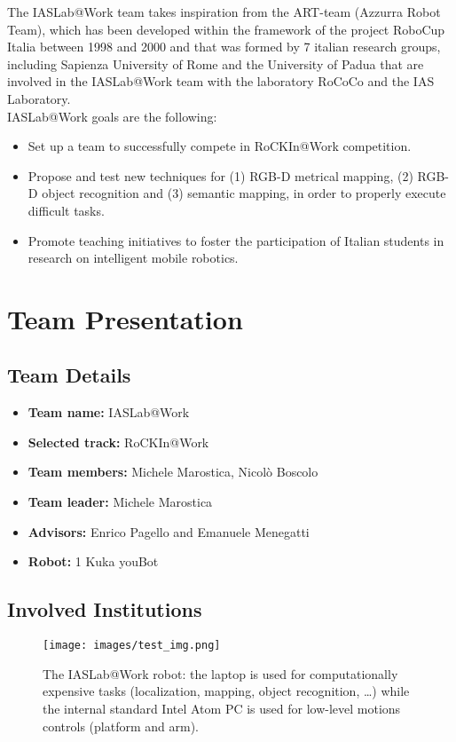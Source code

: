 \documentclass[conference]{IEEEtran}
\begin{document}
The IASLab@Work team takes inspiration from the ART-team (Azzurra Robot Team), which has been developed within the framework of the project RoboCup Italia between 1998 and 2000 and that was formed by 7 italian research groups, including Sapienza University of Rome and the University of Padua that are involved in the IASLab@Work team with the laboratory RoCoCo and the IAS Laboratory.\\ 

IASLab@Work goals are the following:
\begin{itemize}
 \item Set up a team to successfully compete in RoCKIn@Work competition.
 \item Propose and test new techniques for (1) RGB-D metrical mapping, (2) RGB-D object recognition and (3) semantic mapping, in order to properly execute difficult tasks.
 \item Promote teaching initiatives to foster the participation of Italian students in research on intelligent mobile robotics.
\end{itemize}
 
\section{Team Presentation}
\subsection{Team Details}

\begin{itemize}
 \item \textbf{Team name:} IASLab@Work
 \item \textbf{Selected track:} RoCKIn@Work
 \item \textbf{Team members:} Michele Marostica, Nicolò Boscolo %
 \item \textbf{Team leader:} Michele Marostica %
 \item \textbf{Advisors:} Enrico Pagello and Emanuele Menegatti %
 \item \textbf{Robot:} 1 Kuka youBot
\end{itemize}

\subsection{Involved Institutions}
\begin{figure}[t!]
\begin{center}
\texttt{[image: images/test\_img.png]}
\end{center}
\caption{The IASLab@Work robot: the laptop is used for computationally expensive tasks (localization, mapping, object recognition, \dots) while the internal standard Intel Atom PC is used for low-level motions controls (platform and arm).}\label{fig:robot}
\end{figure}
\end{document}

